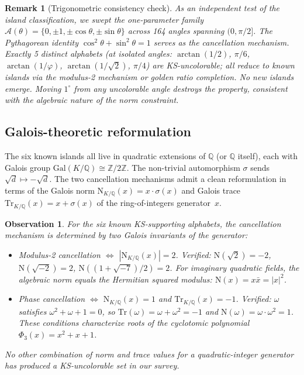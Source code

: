 \documentclass[12pt,a4paper]{article}
\newtheorem{observation}[theorem]{Observation}
\newtheorem{remark}[theorem]{Remark}
\newcommand{\Z}{\mathbb{Z}}
\newcommand{\Q}{\mathbb{Q}}
\begin{document}
\begin{remark}[Trigonometric consistency check]\label{rem:trig}
As an independent test of the island classification, we swept the one-parameter family $\mathcal{A}(\theta) = \{0, \pm 1, \pm\cos\theta, \pm\sin\theta\}$ across 164 angles spanning $(0, \pi/2]$. The Pythagorean identity $\cos^2\theta + \sin^2\theta = 1$ serves as the cancellation mechanism. Exactly 5 distinct alphabets (at isolated angles: $\arctan(1/2)$, $\pi/6$, $\arctan(1/\varphi)$, $\arctan(1/\sqrt{2})$, $\pi/4$) are KS-uncolorable; all reduce to known islands via the modulus-2 mechanism or golden ratio completion. No new islands emerge. Moving $1^\circ$ from any uncolorable angle destroys the property, consistent with the algebraic nature of the norm constraint.
\end{remark}

\subsection{Galois-theoretic reformulation}\label{sec:galois}

The six known islands all live in quadratic extensions of $\Q$ (or $\Q$ itself), each with Galois group $\mathrm{Gal}(K/\Q) \cong \Z/2\Z$.  The non-trivial automorphism $\sigma$ sends $\sqrt{d} \mapsto -\sqrt{d}$.  The two cancellation mechanisms admit a clean reformulation in terms of the Galois norm $\mathrm{N}_{K/\Q}(x) = x \cdot \sigma(x)$ and Galois trace $\mathrm{Tr}_{K/\Q}(x) = x + \sigma(x)$ of the ring-of-integers generator~$x$.

\begin{observation}\label{obs:galois-norm-trace}
For the six known KS-supporting alphabets, the cancellation mechanism is determined by two Galois invariants of the generator:
\begin{itemize}
    \item \emph{Modulus-2 cancellation} $\Leftrightarrow$ $|\mathrm{N}_{K/\Q}(x)| = 2$.  Verified: $\mathrm{N}(\sqrt{2}) = -2$, $\mathrm{N}(\sqrt{-2}) = 2$, $\mathrm{N}((1+\sqrt{-7})/2) = 2$.  For imaginary quadratic fields, the algebraic norm equals the Hermitian squared modulus: $\mathrm{N}(x) = x \bar{x} = |x|^2$.
    \item \emph{Phase cancellation} $\Leftrightarrow$ $\mathrm{N}_{K/\Q}(x) = 1$ and $\mathrm{Tr}_{K/\Q}(x) = -1$.  Verified: $\omega$ satisfies $\omega^2 + \omega + 1 = 0$, so $\mathrm{Tr}(\omega) = \omega + \omega^2 = -1$ and $\mathrm{N}(\omega) = \omega \cdot \omega^2 = 1$.  These conditions characterize roots of the cyclotomic polynomial $\Phi_3(x) = x^2 + x + 1$.
\end{itemize}
No other combination of norm and trace values for a quadratic-integer generator has produced a KS-uncolorable set in our survey.
\end{observation}
\end{document}
